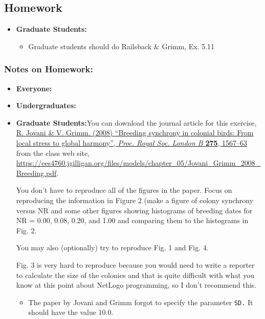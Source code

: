 \documentclass[
]{article}
\providecommand{\tightlist}{%
  \setlength{\itemsep}{0pt}\setlength{\parskip}{0pt}}
\begin{document}
\hypertarget{homework-5}{%
\subsection{Homework}\label{homework-5}}

\begin{itemize}
\tightlist
\item
  \textbf{Graduate Students:}

  \begin{itemize}
  \tightlist
  \item
    Graduate students should do Railsback \& Grimm, Ex. 5.11
  \end{itemize}
\end{itemize}

\hypertarget{notes-on-homework-3}{%
\subsubsection{Notes on Homework:}\label{notes-on-homework-3}}

\begin{itemize}
\item
  \textbf{Everyone:}
\item
  \textbf{Undergraduates:}
\item
  \textbf{Graduate Students:}You can download the journal article for
  this exercise,
  \href{/files/models/chapter_05/Jovani_Grimm_2008_Breeding.pdf}{R.
  Jovani \& V. Grimm. (2008) ``Breeding synchrony in colonial birds:
  From local stress to global harmony'', \emph{Proc. Royal Soc. London
  B} \textbf{275}, 1567--63} from the class web site,
  \url{https://ees4760.jgilligan.org/files/models/chapter_05/Jovani_Grimm_2008_Breeding.pdf}.

  You don't have to reproduce all of the figures in the paper. Focus on
  reproducing the information in Figure 2 (make a figure of colony
  synchrony versus NR and some other figures showing histograms of
  breeding dates for NR = 0.00, 0.08, 0.20, and 1.00 and comparing them
  to the histograms in Fig. 2.

  You may also (optionally) try to reproduce Fig. 1 and Fig. 4.

  Fig. 3 is very hard to reproduce because you would need to write a
  reporter to calculate the size of the colonies and that is quite
  difficult with what you know at this point about NetLogo programming,
  so I don't recommend this.

  \begin{itemize}
  \tightlist
  \item
    The paper by Jovani and Grimm forgot to specify the parameter
    \texttt{SD.} It should have the value 10.0.
  \end{itemize}
\end{itemize}
\end{document}
